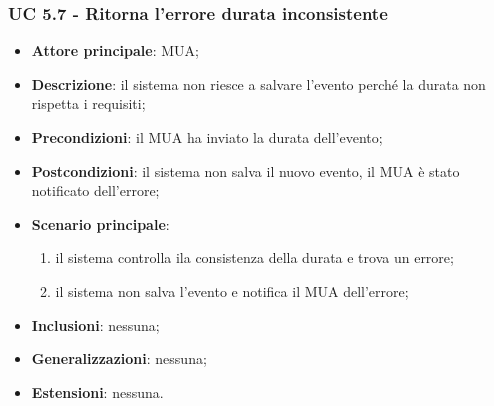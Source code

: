     \subsubsection{UC 5.7 - Ritorna l'errore durata inconsistente} \label{sec:UC5.7}
    \begin{itemize}
        \item \textbf{Attore principale}: MUA;
        \item \textbf{Descrizione}: il sistema non riesce a salvare l'evento perché la durata non rispetta i requisiti;
        \item \textbf{Precondizioni}: il MUA ha inviato la durata dell'evento;
        \item \textbf{Postcondizioni}: il sistema non salva il nuovo evento, il MUA è stato notificato dell'errore;
        \item \textbf{Scenario principale}:
            \begin{enumerate}
                \item il sistema controlla ila consistenza della durata e trova un errore;
                \item il sistema non salva l'evento e notifica il MUA dell'errore;
            \end{enumerate}
        \item \textbf{Inclusioni}: nessuna;
        \item \textbf{Generalizzazioni}: nessuna;
        \item \textbf{Estensioni}: nessuna.
    \end{itemize}